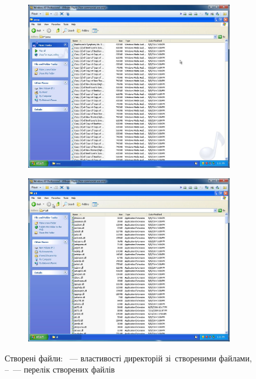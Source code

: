 \documentclass[
	a4paper,
	oneside,
	DIV = 12,
	fontsize = 13pt,
	headings = normal,
]{scrartcl}
\begin{document}
\begin{figure}
			\begin{subfigure}{0.5\columnwidth}
				\centering
				\includegraphics[height = 9.5\baselineskip]{./assets/y03s01-pcdiag-lab-03-p03.jpg}
				\caption{}
				\label{subfig:01-03-dll}
			\end{subfigure}%
			\begin{subfigure}{0.5\columnwidth}
				\centering
				\includegraphics[height = 9.5\baselineskip]{./assets/y03s01-pcdiag-lab-03-p04.jpg}
				\caption{}
				\label{subfig:01-03-wav}
			\end{subfigure}%
			\caption{Створені файли: ~— властивості директорій зі~створеними файлами, –~— перелік створених файлів}
			\label{fig:01-created-files}
		\end{figure}
\end{document}
